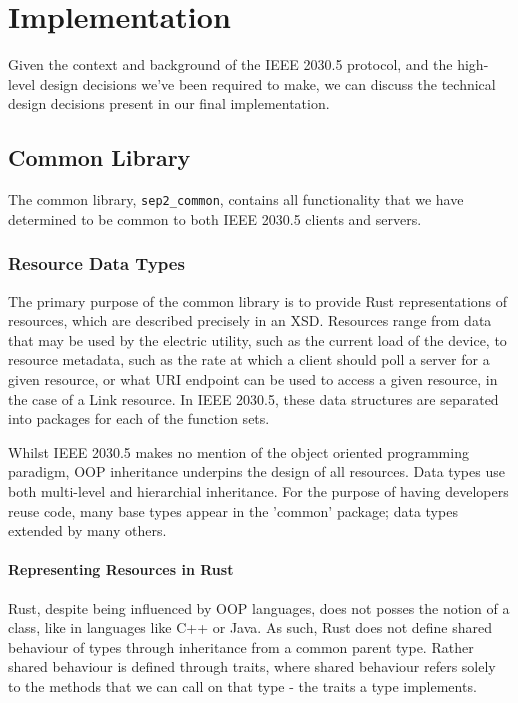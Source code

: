 \chapter{Implementation}\label{ch:implementation}
Given the context and background of the IEEE 2030.5 protocol, and the high-level design decisions we've been required to make, we can discuss the technical design decisions present in our final implementation.

\section{Common Library}
The common library, \texttt{sep2\_common}, contains all functionality that we have determined to be common to both IEEE 2030.5 clients and servers.

\subsection{Resource Data Types}
The primary purpose of the common library is to provide Rust representations of resources, which are described precisely in an XSD.
Resources range from data that may be used by the electric utility, such as the current load of the device, to resource metadata, such as the rate at which a client should poll a server for a given resource, or what URI endpoint can be used to access a given resource, in the case of a Link resource.
In IEEE 2030.5, these data structures are separated into packages for each of the function sets.

Whilst IEEE 2030.5 makes no mention of the object oriented programming paradigm, OOP inheritance underpins the design of all resources. Data types use both multi-level and hierarchial inheritance.
For the purpose of having developers reuse code, many base types appear in the 'common' package; data types extended by many others.

\subsubsection{Representing Resources in Rust}
Rust, despite being influenced by OOP languages, does not posses the notion of a class, like in languages like C++ or Java. As such, Rust does not define shared behaviour of types through inheritance from a common parent type. 
Rather shared behaviour is defined through traits, where shared behaviour refers solely to the methods that we can call on that type - the traits a type implements.

